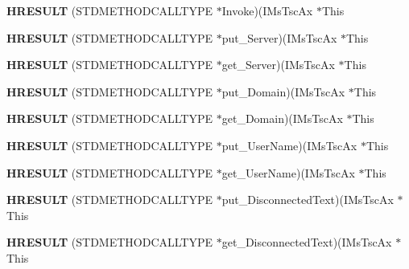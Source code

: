 \begin{DoxyCompactItemize}
{\bfseries H\+R\+E\+S\+U\+LT} (S\+T\+D\+M\+E\+T\+H\+O\+D\+C\+A\+L\+L\+T\+Y\+PE $\ast$Invoke)(I\+Ms\+Tsc\+Ax $\ast$This
\item 
\mbox{\label{struct_i_ms_tsc_ax_vtbl_adbbb73f1bd99e75835b30c46f9476ab4}} 
{\bfseries H\+R\+E\+S\+U\+LT} (S\+T\+D\+M\+E\+T\+H\+O\+D\+C\+A\+L\+L\+T\+Y\+PE $\ast$put\+\_\+\+Server)(I\+Ms\+Tsc\+Ax $\ast$This
\item 
\mbox{\label{struct_i_ms_tsc_ax_vtbl_a4549cfbe9269e3e1fd663903a99823e0}} 
{\bfseries H\+R\+E\+S\+U\+LT} (S\+T\+D\+M\+E\+T\+H\+O\+D\+C\+A\+L\+L\+T\+Y\+PE $\ast$get\+\_\+\+Server)(I\+Ms\+Tsc\+Ax $\ast$This
\item 
\mbox{\label{struct_i_ms_tsc_ax_vtbl_a3be796247ccac922121ef0c8256ba80e}} 
{\bfseries H\+R\+E\+S\+U\+LT} (S\+T\+D\+M\+E\+T\+H\+O\+D\+C\+A\+L\+L\+T\+Y\+PE $\ast$put\+\_\+\+Domain)(I\+Ms\+Tsc\+Ax $\ast$This
\item 
\mbox{\label{struct_i_ms_tsc_ax_vtbl_a6380cf7fced955c151fb90de59060bb5}} 
{\bfseries H\+R\+E\+S\+U\+LT} (S\+T\+D\+M\+E\+T\+H\+O\+D\+C\+A\+L\+L\+T\+Y\+PE $\ast$get\+\_\+\+Domain)(I\+Ms\+Tsc\+Ax $\ast$This
\item 
\mbox{\label{struct_i_ms_tsc_ax_vtbl_a106bd47cd96204f5b0b79a3d23bf6d7f}} 
{\bfseries H\+R\+E\+S\+U\+LT} (S\+T\+D\+M\+E\+T\+H\+O\+D\+C\+A\+L\+L\+T\+Y\+PE $\ast$put\+\_\+\+User\+Name)(I\+Ms\+Tsc\+Ax $\ast$This
\item 
\mbox{\label{struct_i_ms_tsc_ax_vtbl_ad22d0cf3b0dcea085a43ca6a2c186a7b}} 
{\bfseries H\+R\+E\+S\+U\+LT} (S\+T\+D\+M\+E\+T\+H\+O\+D\+C\+A\+L\+L\+T\+Y\+PE $\ast$get\+\_\+\+User\+Name)(I\+Ms\+Tsc\+Ax $\ast$This
\item 
\mbox{\label{struct_i_ms_tsc_ax_vtbl_ad558434f125acb34da1f0afc19902bc9}} 
{\bfseries H\+R\+E\+S\+U\+LT} (S\+T\+D\+M\+E\+T\+H\+O\+D\+C\+A\+L\+L\+T\+Y\+PE $\ast$put\+\_\+\+Disconnected\+Text)(I\+Ms\+Tsc\+Ax $\ast$This
\item 
\mbox{\label{struct_i_ms_tsc_ax_vtbl_a7f5fff9808e278b6b3be0fd03dd11e58}} 
{\bfseries H\+R\+E\+S\+U\+LT} (S\+T\+D\+M\+E\+T\+H\+O\+D\+C\+A\+L\+L\+T\+Y\+PE $\ast$get\+\_\+\+Disconnected\+Text)(I\+Ms\+Tsc\+Ax $\ast$This

\end{DoxyCompactItemize}
